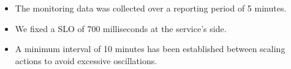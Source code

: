 











\begin{itemize}

\item The monitoring data was collected over a reporting period of 5 minutes.

\item We fixed a SLO of 700 milliseconds at the service's side.



\item A minimum interval of 10 minutes has been established between scaling actions to avoid excessive oscillations. 
\end{itemize}


